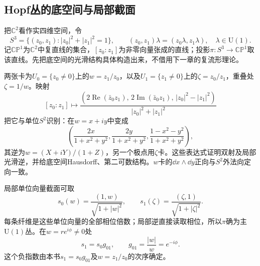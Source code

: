 \subsection{Hopf丛的底空间与局部截面}
把$\mathbb C^2$看作实四维空间，令
\[
 S^3=\{(z_0,z_1):|z_0|^2+|z_1|^2=1\},\qquad
 (z_0,z_1)\lambda=(z_0\lambda,z_1\lambda),\quad\lambda\in\mathrm U(1).
\]
记$\mathbb{CP}^1$为$\mathbb C^2$中复直线的集合，$[z_0:z_1]$为非零向量张成的直线；投影$\pi:S^3\to\mathbb{CP}^1$取该直线。先把底空间的光滑结构具体构造出来，不借用下一章的复流形理论。

两张卡为$U_0=\{z_0\ne0\}$上的$w=z_1/z_0$，以及$U_1=\{z_1\ne0\}$上的$\zeta=z_0/z_1$，重叠处$\zeta=1/w$。映射
\begin{equation}\label{eq:hopf-sphere}
 [z_0:z_1]\longmapsto
 \frac{(2\operatorname{Re}(\bar z_0z_1),\,2\operatorname{Im}(\bar z_0z_1),\,
 |z_0|^2-|z_1|^2)}{|z_0|^2+|z_1|^2}
\end{equation}
把它与单位$S^2$识别：在$w=x+iy$中变成
\[
 \left(\frac{2x}{1+x^2+y^2},\frac{2y}{1+x^2+y^2},
 \frac{1-x^2-y^2}{1+x^2+y^2}\right),
\]
其逆为$w=(X+iY)/(1+Z)$，另一个极点用$\zeta$卡。这些表达式证明双射及局部光滑逆，并给底空间Hausdorff、第二可数结构。$w$卡的$\dd x\wedge\dd y$正向与$S^2$外法向定向一致。

局部单位向量截面可取
\begin{equation}\label{eq:hopf-sections}
 s_0(w)=\frac{(1,w)}{\sqrt{1+|w|^2}},\qquad
 s_1(\zeta)=\frac{(\zeta,1)}{\sqrt{1+|\zeta|^2}}.
\end{equation}
每条纤维是这些单位向量的全部相位倍数；局部逆直接读取相位，所以$\pi$确为主$\mathrm U(1)$丛。在$w=re^{i\phi}\ne0$处
\begin{equation}\label{eq:hopf-transition}
 s_1=s_0g_{01},\qquad g_{01}=\frac{|w|}{w}=e^{-i\phi}.
\end{equation}
这个负指数由本书$s_1=s_0g_{01}$及$w=z_1/z_0$的次序确定。

